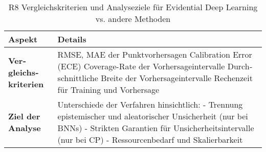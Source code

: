 \begin{otherlanguage}{ngerman}
\begin{table}[htbp]
\centering
\footnotesize
\begin{tabularx}{\textwidth}{|l|X|}
\hline
\textbf{Aspekt} & \textbf{Details} \\ \hline

\textbf{Vergleichskriterien} &
RMSE, MAE der Punktvorhersagen \newline
Calibration Error (ECE) \newline
Coverage-Rate der Vorhersageintervalle \newline
Durchschnittliche Breite der Vorhersageintervalle \newline
Rechenzeit für Training und Vorhersage \\ \hline

\textbf{Ziel der Analyse} &
Unterschiede der Verfahren hinsichtlich: \newline
- Trennung epistemischer und aleatorischer Unsicherheit (nur bei BNNs) \newline
- Strikten Garantien für Unsicherheitsintervalle (nur bei CP) \newline
- Ressourcenbedarf und Skalierbarkeit \\ \hline

\end{tabularx}
\caption{R8 Vergleichskriterien und Analyseziele für Evidential Deep Learning vs. andere Methoden}
\label{tab:vergleichskriterien}
\end{table}









\end{otherlanguage}
